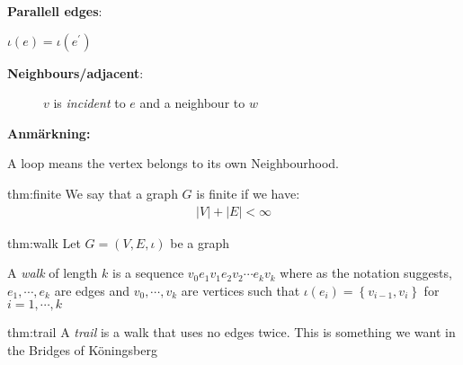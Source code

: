 \newpage
\noindent\textbf{Parallell edges}:\par
\noindent $\iota(e) = \iota(e^{\prime})$
\begin{figure}[ht!]
    \centering
    \caption{}
\end{figure}
\par\bigskip
\noindent\textbf{Neighbours/adjacent}:\par
\begin{figure}[ht!]
    \centering
    \caption{$v$ is \textit{incident} to $e$ and a neighbour to $w$}
\end{figure}
\par\bigskip
\noindent\textbf{Anmärkning:}\par
\noindent A loop means the vertex belongs to its own Neighbourhood. 
\par\bigskip
\begin{theo}{thm:finite}
  We say that a graph $G$ is finite if we have:
  \begin{equation*}
    \begin{gathered}
      \left|V\right|+\left|E\right|< \infty
    \end{gathered}
  \end{equation*}
\end{theo}
\par\bigskip
\begin{theo}[Walk]{thm:walk}
  Let $G = (V,E,\iota)$ be a graph\par
  \noindent A \textit{walk} of length $k$ is a sequence $v_0e_1v_1e_2v_2\cdots e_kv_k$ where as the notation suggests, $e_1,\cdots,e_k$ are edges and $v_0,\cdots,v_k$ are vertices such that $\iota(e_i) = \left\{v_{i-1},v_i\right\}$ for $i=1,\cdots,k$
\end{theo}
\par\bigskip
\begin{theo}[Trail]{thm:trail}
  A \textit{trail} is a walk that uses no edges twice. This is something we want in the Bridges of Köningsberg
\end{theo}
